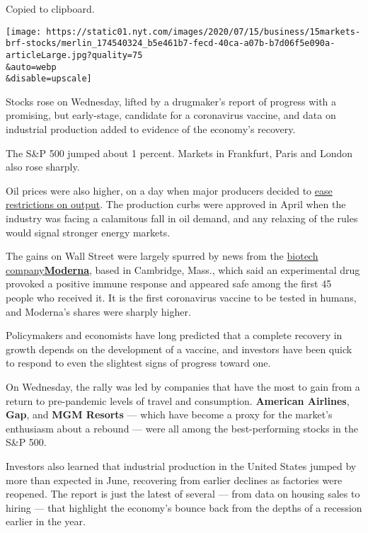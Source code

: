 Copied to clipboard.

\texttt{[image: https://static01.nyt.com/images/2020/07/15/business/15markets-brf-stocks/merlin\_174540324\_b5e461b7-fecd-40ca-a07b-b7d06f5e090a-articleLarge.jpg?quality=75\\\&auto=webp\\\&disable=upscale]}

Stocks rose on Wednesday, lifted by a drugmaker's report of progress
with a promising, but early-stage, candidate for a coronavirus vaccine,
and data on industrial production added to evidence of the economy's
recovery.

The S\&P 500 jumped about 1 percent. Markets in Frankfurt, Paris and
London also rose sharply.

Oil prices were also higher, on a day when major producers decided to
\href{https://www.nytimes.com/2020/07/12/business/economy/opec-russia-oil-production-coronavirus.html}{ease
restrictions on output}. The production curbs were approved in April
when the industry was facing a calamitous fall in oil demand, and any
relaxing of the rules would signal stronger energy markets.

The gains on Wall Street were largely spurred by news from the
\href{https://www.nytimes.com/2020/07/14/health/cornavirus-vaccine-moderna.html?action=click\&module=Top\%20Stories\&pgtype=Homepage}{biotech
company}\textbf{\href{https://www.nytimes.com/2020/07/14/health/cornavirus-vaccine-moderna.html?action=click\&module=Top\%20Stories\&pgtype=Homepage}{Moderna}},
based in Cambridge, Mass., which said an experimental drug provoked a
positive immune response and appeared safe among the first 45 people who
received it. It is the first coronavirus vaccine to be tested in humans,
and Moderna's shares were sharply higher.

Policymakers and economists have long predicted that a complete recovery
in growth depends on the development of a vaccine, and investors have
been quick to respond to even the slightest signs of progress toward
one.

On Wednesday, the rally was led by companies that have the most to gain
from a return to pre-pandemic levels of travel and consumption.
\textbf{American Airlines}, \textbf{Gap}, and \textbf{MGM Resorts} ---
which have become a proxy for the market's enthusiasm about a rebound
--- were all among the best-performing stocks in the S\&P 500.

Investors also learned that industrial production in the United States
jumped by more than expected in June, recovering from earlier declines
as factories were reopened. The report is just the latest of several ---
from data on housing sales to hiring --- that highlight the economy's
bounce back from the depths of a recession earlier in the year.

